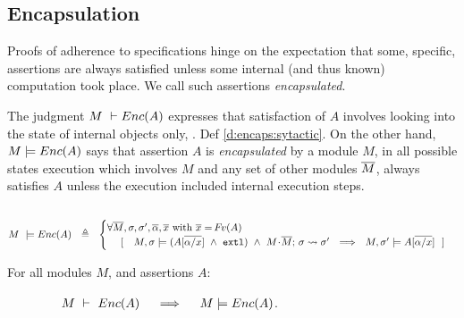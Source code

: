  
\subsection{Encapsulation} %
\label{s:preserve:encaps}
 
Proofs of adherence to specifications  hinge on the expectation that some,  specific, assertions are always satisfied unless some internal (and thus known) computation took place. 
{We call such assertions   \emph{encapsulated}.}
 

The judgment $M\ \vdash {\ensuremath Enc( A )}$  expresses that satisfaction of $A$ involves looking into the state of  
internal objects only,  \cf. Def \ref{d:encaps:sytactic}.
{On the other hand, $M  \models {\ensuremath Enc( A )}$ says that assertion $A$  is  \emph{encapsulated} by a module $M$, \ie in all possible states %
execution which involves $M$ and any set of other modules $\overline{M}$, always satisfies  $A$  unless the execution  included internal execution steps}.
 

\begin{definition} $~$ 
\label{d:encaps}

$ %
    M\ \models \encaps{A}\ \   \triangleq  \ \   
    \begin{cases}
     \forall \Mtwo, \sigma, \sigma',  \overline{\alpha}, \overline{x} \mbox{ with } \overline{x}=\fv(A)\\ %
   \ \ \ \  [\ \ \  \satisfiesA{M}{\sigma}{({A[{\overline {\alpha/x}}]} \ \wedge\ \externalexec)}\  \wedge\ { \leadstoBounded {M\madd\Mtwo}  {\sigma}{\sigma'}} %
   \ \ \Longrightarrow\ \ 
   {M},{\sigma'}\models{A[{\overline {\alpha/x}}]} \ \  ]
    \end{cases}
 $%
  \end{definition}
  
 
  \begin{lemma}
\label{lem:encap-soundness}
For all modules $M$, and assertions $A$: 

$\strut \hspace{1.5cm} M\ \vdash\ {Enc( A )} \ \ \ \ \Longrightarrow\ \ \ \ M \models {\ensuremath Enc( A )}$.
\end{lemma}

